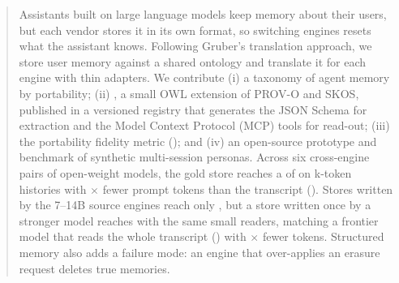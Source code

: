 \begin{abstract}
Assistants built on large language models keep memory about their users, but each vendor stores
it in its own format, so switching engines resets what the assistant knows. Following Gruber's
translation approach, we store user memory against a shared ontology and translate it for each
engine with thin adapters. We contribute (i) a taxonomy of agent memory by portability;
(ii) \memcore, a small OWL extension of PROV-O and SKOS, published in a versioned registry that
generates the JSON Schema for extraction and the Model Context Protocol (MCP) tools for read-out; (iii) the portability
fidelity metric (\PFM); and (iv) an open-source prototype and benchmark of synthetic multi-session
personas. Across six cross-engine pairs of open-weight models, the gold store reaches a \PFM of
 on k-token histories with
$\times$ fewer prompt tokens than the transcript
(). Stores written by the 7--14B source engines reach only , but
a store written once by a stronger model reaches  with the same small
readers, matching a frontier model that reads the whole transcript ()
with $\times$ fewer tokens. Structured memory also adds a failure mode:
an engine that over-applies an erasure request deletes true memories.
\end{abstract}
